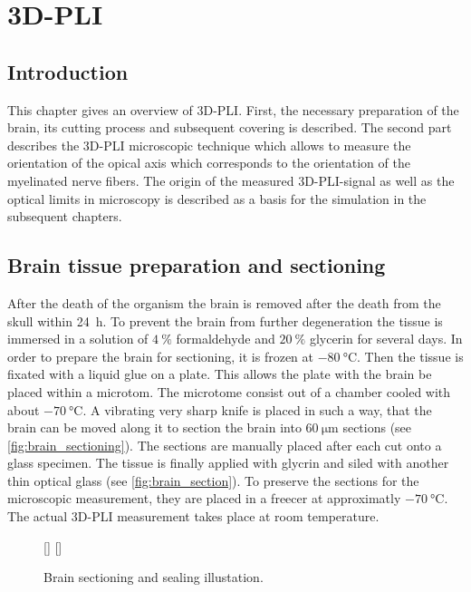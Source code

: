 \cleardoublepage
\setcounter{chapter}{3}
\chapter{3D-PLI}
\label{sec:pli}
%
\section{Introduction}
% 
This chapter gives an overview of \ac{3D-PLI}.
First, the necessary preparation of the brain, its cutting process and subsequent covering is described.
The second part describes the \ac{3D-PLI} microscopic technique which allows to measure the orientation of the opical axis which corresponds to the orientation of the myelinated nerve fibers.
The origin of the measured \ac{3D-PLI}-signal as well as the optical limits in microscopy is described as a basis for the simulation in the subsequent chapters. 
% 
% 
% 
\section{Brain tissue preparation and sectioning}
% 
After the death of the organism the brain is removed after the death from the skull within \SI{24}{\hour}.
To prevent the brain from further degeneration the tissue is immersed in a solution of $\SI{4}{\percent}$ formaldehyde and $\SI{20}{\percent}$ glycerin for several days.
In order to prepare the brain for sectioning, it is frozen at $\SI{-80}{\celsius}$.
Then the tissue is fixated with a liquid glue on a plate.
This allows the plate with the brain be placed within a microtom.
The microtome consist out of a chamber cooled with about $\SI{-70}{\celsius}$.
A vibrating very sharp knife is placed in such a way, that the brain can be moved along it to section the brain into $\SI{60}{\micro\meter}$ sections (see \cref{fig:brain_sectioning}).
The sections are manually placed after each cut onto a glass specimen.
The tissue is finally applied with glycrin and siled with another thin optical glass (see \cref{fig:brain_section}).
To preserve the sections for the microscopic measurement, they are placed in a freecer at approximatly $\SI{-70}{\celsius}$.
The actual \ac{3D-PLI} measurement takes place at room temperature.
% 
\begin{figure}[!t]
	\centering
    \setlength{\tikzwidth}{0.475\textwidth}
    [\tikzwidth]{}
    \hfill
    [\tikzwidth]{}
	\caption{Brain sectioning and sealing illustation.}
\end{figure}
% 
% 
% 
